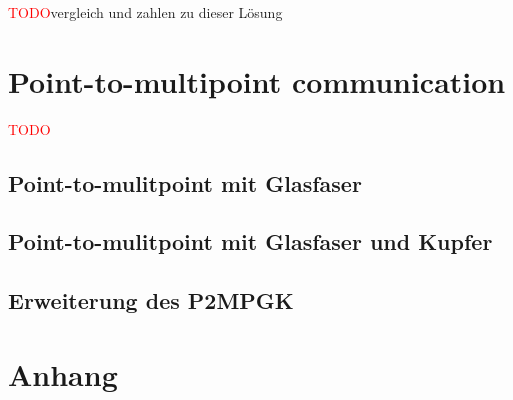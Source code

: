 \documentclass[11pt,a4paper]{article}
\newcommand{\TODO}{\textcolor{red}{TODO}}
\theoremstyle{my_th_style1}
\begin{document}
\TODO vergleich und zahlen zu dieser Lösung

\section{Point-to-multipoint communication}
\TODO
 
 \subsection{Point-to-mulitpoint mit Glasfaser}
 \subsection{Point-to-mulitpoint mit Glasfaser und Kupfer}
 \subsection{Erweiterung des P2MPGK}
 
\newpage

\renewcommand{\refname}{Literaturverzeichnis}

\thispagestyle{empty}
\newpage
\appendix
\section*{Anhang}
\thispagestyle{empty}
\end{document}
